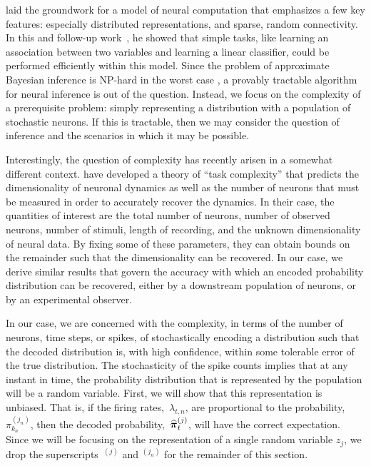\citet{valiant1994circuits} laid the groundwork for a model of neural
computation that emphasizes a few key features: especially distributed
representations, and sparse, random connectivity. In this and
follow-up work~\cite{valiant2005memorization,
  valiant2006quantitative}, he showed that simple tasks, like learning
an association between two variables and learning a linear classifier,
could be performed efficiently within this model. Since the problem of
approximate Bayesian inference is NP-hard in the worst case
\cite{dagum1993approximating, roth1996hardness}, a provably tractable
algorithm for neural inference is out of the question. Instead, we
focus on the complexity of a prerequisite problem: simply representing
a distribution with a population of stochastic neurons. If this is
tractable, then we may consider the question of inference and the
scenarios in which it may be possible.

Interestingly, the question of complexity has recently arisen in a
somewhat different context. \citet{gao2015simplicity} have developed a
theory of ``task complexity'' that predicts the dimensionality of
neuronal dynamics as well as the number of neurons that must be
measured in order to accurately recover the dynamics. In their case,
the quantities of interest are the total number of neurons, number of
observed neurons, number of stimuli, length of recording, and the
unknown dimensionality of neural data. By fixing some of these
parameters, they can obtain bounds on the remainder such that the
dimensionality can be recovered. In our case, we derive similar
results that govern the accuracy with which an encoded probability
distribution can be recovered, either by a downstream population of
neurons, or by an experimental observer.

In our case, we are concerned with the complexity, in terms of the
number of neurons, time steps, or spikes, of stochastically encoding a
distribution such that the decoded distribution is, with high
confidence, within some tolerable error of the true distribution.
The stochasticity of the spike counts implies that at any instant in
time, the probability distribution that is represented by the
population will be a random variable.  First, we will show that this
representation is unbiased. That is, if the firing rates,~$\lambda_{t,
  n}$, are proportional to the probability,~$\pi_{k_n}^{(j_n)}$, then
the decoded probability,~$\widehat{\boldsymbol{\pi}}_{t}^{(j)}$, will have the
correct expectation.  Since we will be focusing on the representation
of a single random variable $z_j$, we drop the superscripts~${}^{(j)}$
and ${}^{(j_n)}$ for the remainder of this section.

